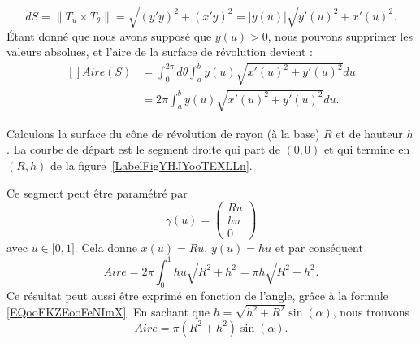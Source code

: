 \begin{equation}
    dS=\| T_u\times T_{\theta} \|=\sqrt{(y'y)^2+(x'y)^2}=| y(u) |\sqrt{y'(u)^2+x'(u)^2}.
\end{equation}
Étant donné que nous avons supposé que $y(u)>0$, nous pouvons supprimer les valeurs absolues, et l'aire de la surface de révolution devient :
\begin{equation}
    \begin{aligned}[]
        Aire(S)&=\int_0^{2\pi}d\theta\int_a^b y(u)\sqrt{x'(u)^2+y'(u)^2}du\\
        &=2\pi\int_a^b y(u)\sqrt{x'(u)^2+y'(u)^2}du.
    \end{aligned}
\end{equation}

\begin{example}     \label{EXooZCLXooVmXQgY}
    Calculons la surface du cône de révolution de rayon (à la base) $R$ et de hauteur $h$. La courbe de départ est le segment droite qui part de $(0,0)$ et qui termine en $(R,h)$ de la figure~\ref{LabelFigYHJYooTEXLLn}. %
\newcommand{\CaptionFigYHJYooTEXLLn}{En faisant tourner cette droite autour de l'axe $X$, nous obtenons un cône.}


    Ce segment peut être paramétré par
    \begin{equation}
        \gamma(u)=\begin{pmatrix}
            Ru    \\
            hu    \\
            0
        \end{pmatrix}
    \end{equation}
    avec $u\in\mathopen[ 0 , 1 \mathclose]$. Cela donne $x(u)=Ru$, $y(u)=hu$ et par conséquent
    \begin{equation}
        Aire=2\pi\int_0^1hu\sqrt{R^2+h^2}=\pi h\sqrt{R^2+h^2}.
    \end{equation}
    Ce résultat peut aussi être exprimé en fonction de l'angle, grâce à la formule \eqref{EQooEKZEooFeNImX}. En sachant que $h=\sqrt{h^2+R^2}\sin(\alpha)$, nous trouvons
    \begin{equation}
        Aire=\pi(R^2+h^2)\sin(\alpha).
    \end{equation}

\end{example}

